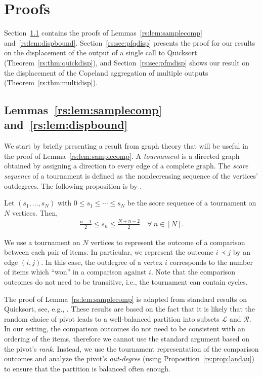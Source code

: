\section{Proofs}  %
\label{rs:sec:proofs}

Section~\ref{rs:sec:pflemmas} contains the proofs of Lemmas~\ref{rs:lem:samplecomp} and~\ref{rs:lem:dispbound}.
Section~\ref{rs:sec:pfqdisp} presents the proof for our results on the displacement of the output of a single call to Quicksort (Theorem~\ref{rs:thm:quickdisp}), and Section~\ref{rs:sec:pfmdisp} shows our result on the displacement of the Copeland aggregation of multiple outputs (Theorem~\ref{rs:thm:multidisp}).

\subsection{Lemmas~\ref{rs:lem:samplecomp} and~\ref{rs:lem:dispbound}}
\label{rs:sec:pflemmas}

We start by briefly presenting a result from graph theory that will be useful in the proof of Lemma~\ref{rs:lem:samplecomp}.
A \emph{tournament} is a directed graph obtained by assigning a direction to every edge of a complete graph.
The \emph{score sequence} of a tournament is defined as the nondecreasing sequence of the vertices' outdegrees.
The following proposition is by \citet{landau1953dominance}.

\begin{proposition}
\label{rs:prop:landau}
Let $(s_1, \ldots, s_N)$ with $0 \le s_1 \le \cdots \le s_N$ be the score sequence of a tournament on $N$ vertices.
Then,
\begin{align*}
\frac{n - 1}{2} \le s_n \le \frac{N + n - 2}{2} \quad \forall\ n \in [N].
\end{align*}
\end{proposition}

We use a tournament on $N$ vertices to represent the outcome of a comparison between each pair of items.
In particular, we represent the outcome $i \prec j$ by an edge $(i, j)$.
In this case, the outdegree of a vertex $i$ corresponds to the number of items which ``won'' in a comparison against $i$.
Note that the comparison outcomes do not need to be transitive, i.e., the tournament can contain cycles.

The proof of Lemma~\ref{rs:lem:samplecomp} is adapted from standard results on Quicksort, see, e.g., \citet[][Section 3.3.3]{dubhashi2009concentration}.
These results are based on the fact that it is likely that the random choice of pivot leads to a well-balanced partition into subsets $\mathcal{L}$ and $\mathcal{R}$.
In our setting, the comparison outcomes do not need to be consistent with an ordering of the items, therefore we cannot use the standard argument based on the pivot's \emph{rank}.
Instead, we use the tournament representation of the comparison outcomes and analyze the pivot's \emph{out-degree} (using Proposition~\ref{rs:prop:landau}) to ensure that the partition is balanced often enough.

